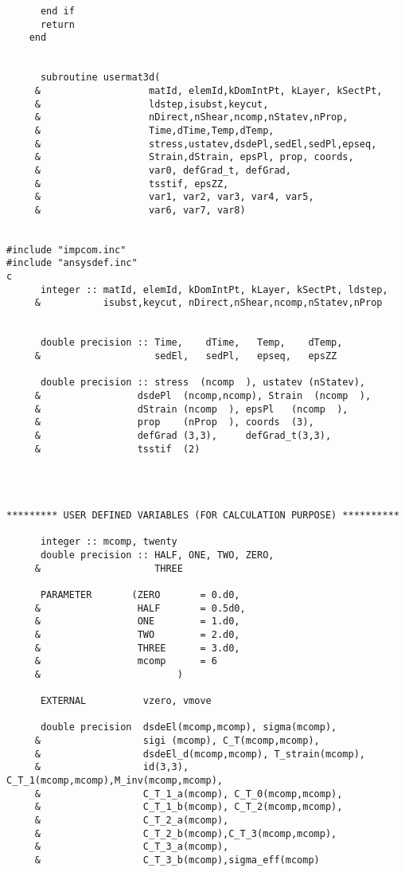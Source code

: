 \begin{lstlisting}
      end if
      return
	end
	

      subroutine usermat3d(
     &                   matId, elemId,kDomIntPt, kLayer, kSectPt,
     &                   ldstep,isubst,keycut,
     &                   nDirect,nShear,ncomp,nStatev,nProp,
     &                   Time,dTime,Temp,dTemp,
     &                   stress,ustatev,dsdePl,sedEl,sedPl,epseq,
     &                   Strain,dStrain, epsPl, prop, coords, 
     &                   var0, defGrad_t, defGrad,
     &                   tsstif, epsZZ,
     &                   var1, var2, var3, var4, var5,
     &                   var6, var7, var8)
	
	
#include "impcom.inc"
#include "ansysdef.inc"
c
      integer :: matId, elemId, kDomIntPt, kLayer, kSectPt, ldstep,
     &           isubst,keycut, nDirect,nShear,ncomp,nStatev,nProp


      double precision :: Time,    dTime,   Temp,    dTemp,
     &                    sedEl,   sedPl,   epseq,   epsZZ
                  
      double precision :: stress  (ncomp  ), ustatev (nStatev), 
     &                 dsdePl  (ncomp,ncomp), Strain  (ncomp  ), 
     &                 dStrain (ncomp  ), epsPl   (ncomp  ),
     &                 prop    (nProp  ), coords  (3), 
     &                 defGrad (3,3),     defGrad_t(3,3),  
     &                 tsstif  (2)
	

	
	
********* USER DEFINED VARIABLES (FOR CALCULATION PURPOSE) **********	
	
      integer :: mcomp, twenty
      double precision :: HALF, ONE, TWO, ZERO,
     &                    THREE
      
      PARAMETER       (ZERO       = 0.d0,
     &                 HALF       = 0.5d0,
     &                 ONE        = 1.d0,
     &                 TWO        = 2.d0,
     &                 THREE      = 3.d0,
     &                 mcomp      = 6
     &                        )
	
      EXTERNAL          vzero, vmove
   
      double precision  dsdeEl(mcomp,mcomp), sigma(mcomp),
     &                  sigi (mcomp), C_T(mcomp,mcomp),
     &                  dsdeEl_d(mcomp,mcomp), T_strain(mcomp),
     &                  id(3,3), C_T_1(mcomp,mcomp),M_inv(mcomp,mcomp),
     &                  C_T_1_a(mcomp), C_T_0(mcomp,mcomp),
     &                  C_T_1_b(mcomp), C_T_2(mcomp,mcomp), 
     &                  C_T_2_a(mcomp),
     &                  C_T_2_b(mcomp),C_T_3(mcomp,mcomp), 
     &                  C_T_3_a(mcomp),
     &                  C_T_3_b(mcomp),sigma_eff(mcomp)
                  


\end{lstlisting}
